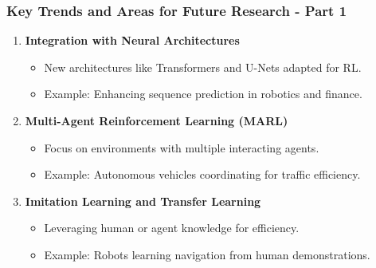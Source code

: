 \documentclass[aspectratio=169]{beamer}
\begin{document}
\begin{frame}[fragile]
    \frametitle{Key Trends and Areas for Future Research - Part 1}
    
    \begin{enumerate}
        \item \textbf{Integration with Neural Architectures}
        \begin{itemize}
            \item New architectures like Transformers and U-Nets adapted for RL.
            \item Example: Enhancing sequence prediction in robotics and finance.
        \end{itemize}

        \item \textbf{Multi-Agent Reinforcement Learning (MARL)}
        \begin{itemize}
            \item Focus on environments with multiple interacting agents.
            \item Example: Autonomous vehicles coordinating for traffic efficiency.
        \end{itemize}

        \item \textbf{Imitation Learning and Transfer Learning}
        \begin{itemize}
            \item Leveraging human or agent knowledge for efficiency.
            \item Example: Robots learning navigation from human demonstrations.
        \end{itemize}
    \end{enumerate}
\end{frame}
\end{document}
